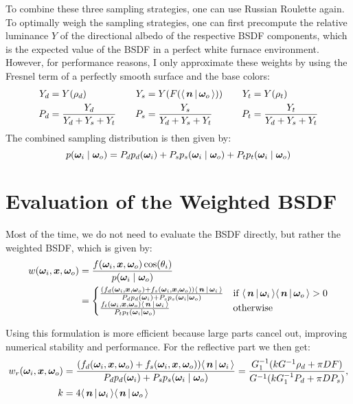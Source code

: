 To combine these three sampling strategies, one can use Russian Roulette again.
To optimally weigh the sampling strategies, one can first precompute the relative luminance $Y$ of the directional albedo of the respective BSDF components, which is the expected value of the BSDF in a perfect white furnace environment.
However, for performance reasons, I only approximate these weights by using the Fresnel term of a perfectly smooth surface and the base colors:
\begin{equation}
    \begin{aligned}
        Y_d &= Y(\rho_d) &\quad
        Y_s &= Y(F(\NdotV)) &\quad
        Y_t &= Y(\rho_t) \\
        P_d &= \frac{Y_d}{Y_d + Y_s + Y_t} &\quad
        P_s &= \frac{Y_s}{Y_d + Y_s + Y_t} &\quad
        P_t &= \frac{Y_t}{Y_d + Y_s + Y_t} \\
    \end{aligned}
\end{equation}
The combined sampling distribution is then given by:
\begin{equation}
    p({\bm{\omega}_i} \mid {\bm{\omega}_o}) = P_d p_d({\bm{\omega}_i}) + P_s p_s({\bm{\omega}_i} \mid {\bm{\omega}_o}) + P_t p_t({\bm{\omega}_i} \mid {\bm{\omega}_o})
\end{equation}

\section{Evaluation of the Weighted BSDF}

Most of the time, we do not need to evaluate the BSDF directly, but rather the weighted BSDF, which is given by:
\begin{equation}
    \begin{aligned}
        w(\wi, \vec{x}, \wo)
        &= \frac{f(\wi, \vec{x}, \wo) \cos(\theta_i)}{p(\wi \mid \wo)}\\
        &= \begin{cases}
            \frac{(f_d(\wi, \vec{x}, \wo) + f_s(\wi, \vec{x}, \wo)) \NdotL}{P_d p_d(\wi) + P_s p_s(\wi \mid \wo)} & \text{if } \NdotL \NdotV > 0 \\
            \frac{f_t(\wi, \vec{x}, \wo) \NdotL}{P_t p_t(\wi \mid \wo)} & \text{otherwise}
        \end{cases}
    \end{aligned}
\end{equation}

Using this formulation is more efficient because large parts cancel out, improving numerical stability and performance.
For the reflective part we then get:
\begin{equation}
    \begin{aligned}
        w_r{(\wi, \vec{x}, \wo)}
        &= \frac{(f_d(\wi, \vec{x}, \wo) + f_s(\wi, \vec{x}, \wo)) \NdotL}{P_d p_d(\wi) + P_s p_s(\wi \mid \wo)}
        = \frac{G_1^{-1} (k G^{-1} \rho_d + \pi D F)}{G^{-1} (k G_1^{-1} P_d + \pi D P_s)},\\
        k &= 4 \NdotL \NdotV
    \end{aligned}
\end{equation}


